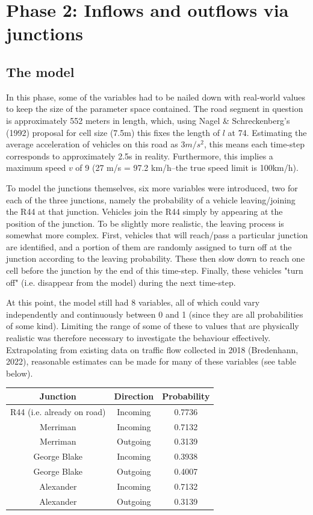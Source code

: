 \documentclass{article}
\begin{document}
\section*{Phase 2: Inflows and outflows via junctions}

\subsection*{The model}

In this phase, some of the variables had to be nailed down with real-world values to keep the size of the parameter space contained. The road segment in question is approximately 552 meters in length, which, using Nagel \& Schreckenberg's (1992) proposal for cell size (7.5m) this fixes the length of $l$ at 74. Estimating the average acceleration of vehicles on this road as $3m/s^{2}$, this means each time-step corresponds to approximately 2.5s in reality. Furthermore, this implies a maximum speed $v$ of 9 (27 m/s = 97.2 km/h--the true speed limit is 100km/h).

To model the junctions themselves, six more variables were introduced, two for each of the three junctions, namely the probability of a vehicle leaving/joining the R44 at that junction. Vehicles join the R44 simply by appearing at the position of the junction. To be slightly more realistic, the leaving process is somewhat more complex. First, vehicles that will reach/pass a particular junction are identified, and a portion of them are randomly assigned to turn off at the junction according to the leaving probability. These then slow down to reach one cell before the junction by the end of this time-step. Finally, these vehicles "turn off" (i.e. disappear from the model) during the next time-step.

At this point, the model still had 8 variables, all of which could vary independently and continuously between 0 and 1 (since they are all probabilities of some kind). Limiting the range of some of these to values that are physically realistic was therefore necessary to investigate the behaviour effectively. Extrapolating from existing data on traffic flow collected in 2018 (Bredenhann, 2022), reasonable estimates can be made for many of these variables (see table below).

\begin{center}
\begin{tabular}{ |c|c|c| }
 \hline
 Junction & Direction & Probability \\
 \hline
 R44 (i.e. already on road) & Incoming & 0.7736\\
 Merriman & Incoming & 0.7132 \\
 Merriman & Outgoing & 0.3139 \\
 George Blake & Incoming & 0.3938 \\
 George Blake & Outgoing & 0.4007 \\
 Alexander & Incoming & 0.7132 \\
 Alexander & Outgoing & 0.3139 \\
 \hline
\end{tabular}
\end{center}
\end{document}
